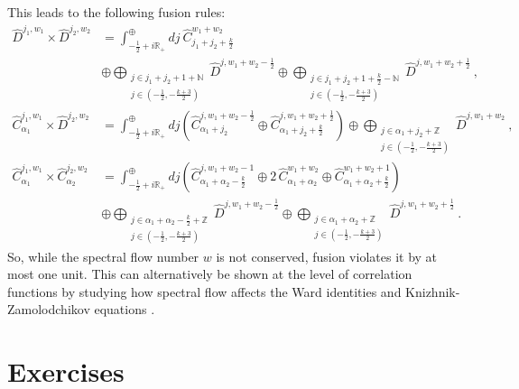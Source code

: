 \documentclass[12pt,a4paper,notitlepage]{report}
\numberwithin{equation}{section}
\theoremstyle{break}
\begin{document}
This leads to the following fusion rules:
\begin{align}
\hat{D}^{j_1,w_1}\times \hat{D}^{j_2,w_2} &= \int^\oplus_{-\frac12+i{\mathbb{R}}_+} dj\ \hat{C}^{w_1+w_2}_{j_1+j_2+\frac{k}{2}} 
\nonumber \\ & \oplus 
\bigoplus_{\substack{j\in j_1+j_2+1+{\mathbb{N}} \\ j\in (-\frac12,-\frac{k+3}{2})}} \hat{D}^{j,w_1+w_2-\frac12} \oplus 
\bigoplus_{\substack{j\in j_1+j_2+1+\frac{k}{2}-{\mathbb{N}} \\ j\in (-\frac12,-\frac{k+3}{2})}} \hat{D}^{j,w_1+w_2+\frac12}\ ,
\\
 \hat{C}^{j_1,w_1}_{\alpha_1}\times \hat{D}^{j_2,w_2} &= \int^\oplus_{-\frac12+i{\mathbb{R}}_+} dj\left( \hat{C}^{j,w_1+w_2-\frac12}_{\alpha_1+j_2} \oplus \hat{C}^{j,w_1+w_2+\frac12}_{\alpha_1+j_2+\frac{k}{2}}\right) \oplus \bigoplus_{\substack{j\in \alpha_1+j_2+{\mathbb{Z}} \\ j\in (-\frac12,-\frac{k+3}{2})}} \hat{D}^{j,w_1+w_2}\ ,
\\
 \hat{C}^{j_1,w_1}_{\alpha_1}\times \hat{C}^{j_2,w_2}_{\alpha_2} &= \int^\oplus_{-\frac12+i{\mathbb{R}}_+} dj \left(\hat{C}^{j,w_1+w_2-1}_{\alpha_1+\alpha_2-\frac{k}{2}} \oplus 2\, \hat{C}^{w_1+w_2}_{\alpha_1+\alpha_2} \oplus \hat{C}^{w_1+w_2+1}_{\alpha_1+\alpha_2+\frac{k}{2}}\right) 
\nonumber \\
&\oplus \bigoplus_{\substack{j\in \alpha_1+\alpha_2-\frac{k}{2}+{\mathbb{Z}} \\ j\in(-\frac12,-\frac{k+3}{2})}} \hat{D}^{j,w_1+w_2-\frac12} 
\oplus \bigoplus_{\substack{j\in \alpha_1+\alpha_2+{\mathbb{Z}} \\ j\in(-\frac12,-\frac{k+3}{2})}} \hat{D}^{j,w_1+w_2+\frac12} \ .
\end{align}
So, while the spectral flow number $w$ is not conserved, fusion violates it by at most one unit.
This can alternatively be shown at the level of correlation functions by studying how spectral flow affects the Ward identities and Knizhnik-Zamolodchikov equations \cite{rib05}.


\section{Exercises}
\end{document}
